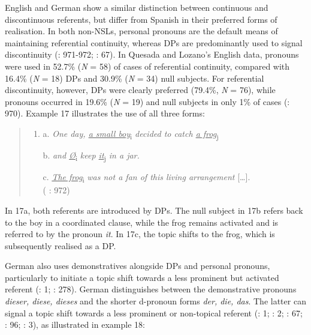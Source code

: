 \documentclass[
  letterpaper,
  DIV=11,
  numbers=noendperiod]{scrartcl}
\begin{document}
English and German show a similar distinction between continuous and
discontinuous referents, but differ from Spanish in their preferred
forms of realisation. In both non-NSLs, personal pronouns are the
default means of maintaining referential continuity, whereas DPs are
predominantly used to signal discontinuity
(: 971-972;
: 67). In
Quesada and Lozano's English data, pronouns were used in 52.7\%
(\emph{N} = 58) of cases of referential continuity, compared with 16.4\%
(\emph{N} = 18) DPs and 30.9\% (\emph{N} = 34) null subjects. For
referential discontinuity, however, DPs were clearly preferred (79.4\%,
\emph{N} = 76), while pronouns occurred in 19.6\% (\emph{N} = 19) and
null subjects in only 1\% of cases (: 970). Example 17 illustrates the use of all
three forms:

\begin{quote}
\begin{enumerate}
\def\labelenumi{\arabic{enumi}.}
\setcounter{enumi}{16}
\item
  a. \emph{One day, \ul{a small boy}}\textsubscript{i} \emph{decided to
  catch \ul{a frog}}\textsubscript{j}

  b. \emph{and \ul{Ø}}\textsubscript{i} \emph{keep
  \ul{it}}\textsubscript{j} \emph{in a jar.}

  c. \ul{\emph{The frog}}\textsubscript{i} \emph{was not a fan of this
  living arrangement} {[}\ldots{]}.\\
  ( : 972)
\end{enumerate}
\end{quote}

In 17a, both referents are introduced by DPs. The null subject in 17b
refers back to the boy in a coordinated clause, while the frog remains
activated and is referred to by the pronoun \emph{it}. In 17c, the topic
shifts to the frog, which is subsequently realised as a DP.

German also uses demonstratives alongside DPs and personal pronouns,
particularly to initiate a topic shift towards a less prominent but
activated referent (: 1; : 278). German
distinguishes between the demonstrative pronouns \emph{dieser, diese,
dieses} and the shorter d-pronoun forms \emph{der, die, das}. The latter
can signal a topic shift towards a less prominent or non-topical
referent (: 1; : 2;
 : 67;
: 96;
: 3), as illustrated in example 18:
\end{document}
